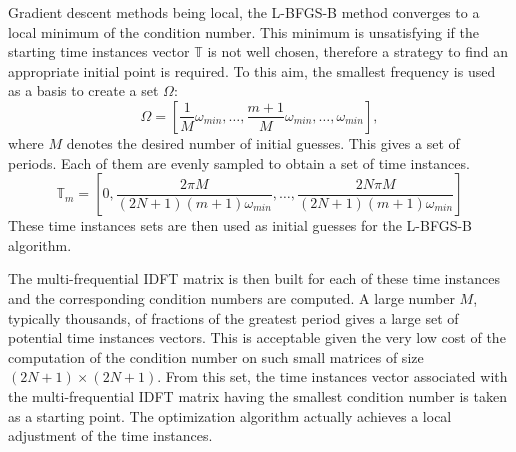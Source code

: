 Gradient descent methods being local, the L-BFGS-B method converges to a local
minimum of the condition number. This minimum is unsatisfying if the
starting time instances vector $\mathbb{T}$ is not well chosen, therefore a strategy
to find an appropriate initial point is required. To this aim, the smallest
frequency is used as a basis to create a set $\Omega$:
\begin{equation}
    \Omega = [\frac{1}{M} \omega_{min}, \ldots, \frac{m+1}{M} \omega_{min}, \ldots, \omega_{min}],
    \label{eq:slitted_period}
\end{equation}
where $M$ denotes the desired number of initial guesses.
This gives a set of periods. Each of them are evenly sampled to obtain a
set of time instances. 
\begin{equation}
    \mathbb{T}_m = \left[ 0, \frac{2 \pi M}{ (2N + 1) (m+1) \omega_{min}}, \ldots, 
                             \frac{2N \pi M}{ (2N + 1) (m+1) \omega_{min}} \right]
    \label{eq:set_of_tlv}
\end{equation}
These time instances sets are then used as initial guesses for the
L-BFGS-B algorithm.

The multi-frequential IDFT matrix is then built for
each of these time instances and the corresponding condition numbers are
computed. A large number $M$, typically thousands, of fractions of the
greatest period gives a large set of potential time instances vectors.
This is acceptable given the very low cost of the computation of the
condition number on such small matrices of size $(2N + 1) \times
(2N+1)$.  From this set, the time instances vector associated with the
multi-frequential IDFT matrix having the smallest condition number is
taken as a starting point.  The optimization algorithm actually achieves
a local adjustment of the time instances.

